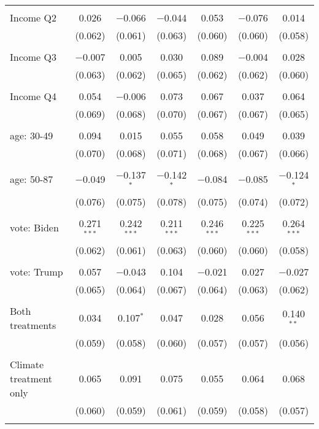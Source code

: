 \begin{tabular}{@{\extracolsep{5pt}}lcccccc}
  & & & & & & \\ 
 Income Q2 & 0.026 & $-$0.066 & $-$0.044 & 0.053 & $-$0.076 & 0.014 \\ 
  & (0.062) & (0.061) & (0.063) & (0.060) & (0.060) & (0.058) \\ 
  & & & & & & \\ 
 Income Q3 & $-$0.007 & 0.005 & 0.030 & 0.089 & $-$0.004 & 0.028 \\ 
  & (0.063) & (0.062) & (0.065) & (0.062) & (0.062) & (0.060) \\ 
  & & & & & & \\ 
 Income Q4 & 0.054 & $-$0.006 & 0.073 & 0.067 & 0.037 & 0.064 \\ 
  & (0.069) & (0.068) & (0.070) & (0.067) & (0.067) & (0.065) \\ 
  & & & & & & \\ 
 age: 30-49 & 0.094 & 0.015 & 0.055 & 0.058 & 0.049 & 0.039 \\ 
  & (0.070) & (0.068) & (0.071) & (0.068) & (0.067) & (0.066) \\ 
  & & & & & & \\ 
 age: 50-87 & $-$0.049 & $-$0.137$^{*}$ & $-$0.142$^{*}$ & $-$0.084 & $-$0.085 & $-$0.124$^{*}$ \\ 
  & (0.076) & (0.075) & (0.078) & (0.075) & (0.074) & (0.072) \\ 
  & & & & & & \\ 
 vote: Biden & 0.271$^{***}$ & 0.242$^{***}$ & 0.211$^{***}$ & 0.246$^{***}$ & 0.225$^{***}$ & 0.264$^{***}$ \\ 
  & (0.062) & (0.061) & (0.063) & (0.060) & (0.060) & (0.058) \\ 
  & & & & & & \\ 
 vote: Trump & 0.057 & $-$0.043 & 0.104 & $-$0.021 & 0.027 & $-$0.027 \\ 
  & (0.065) & (0.064) & (0.067) & (0.064) & (0.063) & (0.062) \\ 
  & & & & & & \\ 
 Both treatments & 0.034 & 0.107$^{*}$ & 0.047 & 0.028 & 0.056 & 0.140$^{**}$ \\ 
  & (0.059) & (0.058) & (0.060) & (0.057) & (0.057) & (0.056) \\ 
  & & & & & & \\ 
 Climate treatment only & 0.065 & 0.091 & 0.075 & 0.055 & 0.064 & 0.068 \\ 
  & (0.060) & (0.059) & (0.061) & (0.059) & (0.058) & (0.057) \\ 
  & & & & & & \\ 

\end{tabular}
